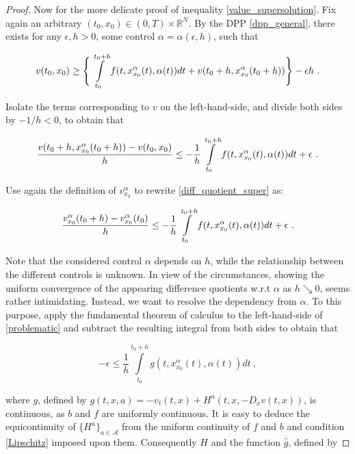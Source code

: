 \begin{theorem}
\begin{proof}
		Now for the more delicate proof of inequality \eqref{value_supersolution}. Fix again an arbitrary $ (t_0, x_0) \in \left( 0 , T \right) \times \mathbb{R}^N $. By the DPP \eqref{dpp_general}, there exists for any $ \epsilon, h > 0 $, some control $ \alpha = \alpha(\epsilon, h) $, such that
		
		\begin{equation*}
			v(t_0, x_0) \geq \Bigg\{ \pathint{\alpha}{t_0}{t_0 + h} + v(t_0 + h, x^{\alpha}_{x_0}(t_0 + h)) \Bigg\} - \epsilon h \ .
		\end{equation*}
		
		Isolate the terms corresponding to $ v $ on the left-hand-side, and divide both sides by $ -1 / h < 0 $, to obtain that
		
		\begin{equation}
			\label{diff_quotient_super}
			\frac{v(t_0 + h, x^{\alpha}_{x_0}(t_0 + h)) - v(t_0, x_0)}{h} \leq - \frac{1}{h} \pathint{\alpha}{t_0}{t_0 + h} + \epsilon \ .
		\end{equation}
		
		Use again the definition of $ v^{\alpha}_{x_0} $ to rewrite \eqref{diff_quotient_super} as:
		
		\begin{equation}
		\label{problematic}
			\frac{v^{\alpha}_{x_0}(t_0 + h) - v^{\alpha}_{x_0}(t_0)}{h} \leq - \frac{1}{h} \pathint{\alpha}{t_0}{t_0 + h} + \epsilon \ .
		\end{equation}
		
		Note that the considered control $ \alpha $ depends on $ h $, while the relationship between the different controls is unknown. In view of the circumstances, showing the uniform convergence of the appearing difference quotients w.r.t $ \alpha $ as $ h \searrow 0 $, seems rather intimidating. Instead, we want to resolve the dependency from $ \alpha $. To this purpose, apply the fundamental theorem of calculus to the left-hand-side of \eqref{problematic} and subtract the resulting integral from both sides to obtain that
		
		\begin{equation}
			\label{resolve}
			- \epsilon \leq \frac{1}{h} \int\limits^{t_0 + h}_{t_0} g(t, x^{\alpha}_{x_0}(t), \alpha(t)) dt \ ,
		\end{equation}
		
		where $ g $, defined by $ g(t, x, a) = - v_t(t, x) + H^{a}(t, x, -D_x v(t, x)) $, is continuous, as $ b $ and $ f $ are uniformly continuous. It is easy to deduce the equicontinuity of $ \{ H^{a} \}_{a \in \mathcal{A}}  $ from the uniform continuity of $ f $ and $ b $ and condition \eqref{Lipschitz} imposed upon them. Consequently $ H $ and the function $ \hat{g} $, defined by
		

\end{proof}
\end{theorem}
